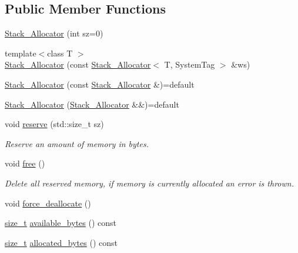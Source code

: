 \subsection*{Public Member Functions}
\begin{DoxyCompactItemize}
\item 
\hyperlink{classbc_1_1allocators_1_1Stack__Allocator_aca9884c66d33f70f85d187ef0ca7140d}{Stack\+\_\+\+Allocator} (int sz=0)
\item 
{\footnotesize template$<$class T $>$ }\\\hyperlink{classbc_1_1allocators_1_1Stack__Allocator_aa6defd84c0564d4cb0b1dcd0828267ab}{Stack\+\_\+\+Allocator} (const \hyperlink{classbc_1_1allocators_1_1Stack__Allocator}{Stack\+\_\+\+Allocator}$<$ T, System\+Tag $>$ \&ws)
\item 
\hyperlink{classbc_1_1allocators_1_1Stack__Allocator_acc97e76a38275f8ef6274935d15428c6}{Stack\+\_\+\+Allocator} (const \hyperlink{classbc_1_1allocators_1_1Stack__Allocator}{Stack\+\_\+\+Allocator} \&)=default
\item 
\hyperlink{classbc_1_1allocators_1_1Stack__Allocator_a165d3b34820254f66d1b197d3208ab1e}{Stack\+\_\+\+Allocator} (\hyperlink{classbc_1_1allocators_1_1Stack__Allocator}{Stack\+\_\+\+Allocator} \&\&)=default
\item 
void \hyperlink{classbc_1_1allocators_1_1Stack__Allocator_abea0efcd0b61dd9e0b6cba7897071492}{reserve} (std\+::size\+\_\+t sz)
\begin{DoxyCompactList}\small\item\em Reserve an amount of memory in bytes. \end{DoxyCompactList}\item 
void \hyperlink{classbc_1_1allocators_1_1Stack__Allocator_af34879f249ea03b3fabee90d1bfee3a0}{free} ()
\begin{DoxyCompactList}\small\item\em Delete all reserved memory, if memory is currently allocated an error is thrown. \end{DoxyCompactList}\item 
void \hyperlink{classbc_1_1allocators_1_1Stack__Allocator_acdb5b0ed948df81cfc0255235cf419a5}{force\+\_\+deallocate} ()
\item 
\hyperlink{namespacebc_aaf8e3fbf99b04b1b57c4f80c6f55d3c5}{size\+\_\+t} \hyperlink{classbc_1_1allocators_1_1Stack__Allocator_ad124466e5e6cc7cecb4023d28a4be432}{available\+\_\+bytes} () const
\item 
\hyperlink{namespacebc_aaf8e3fbf99b04b1b57c4f80c6f55d3c5}{size\+\_\+t} \hyperlink{classbc_1_1allocators_1_1Stack__Allocator_a1642bba13b2dd208fb9c43305759cd2b}{allocated\+\_\+bytes} () const

\end{DoxyCompactItemize}

